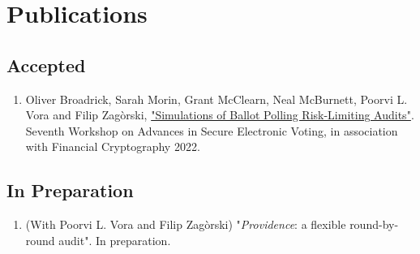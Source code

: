 \documentclass[letterpaper]{article}
\begin{document}
\section*{Publications}

\subsection*{Accepted}
\begin{enumerate}
\item Oliver Broadrick, Sarah Morin, Grant McClearn, Neal McBurnett, Poorvi L. Vora and Filip Zag\`{o}rski, \href{https://oliverbroadrick.com/papers/simulations-of-ballot-polling-rlas.pdf}{"Simulations of Ballot Polling Risk-Limiting Audits"}. Seventh Workshop on Advances in Secure Electronic Voting, in association with Financial Cryptography 2022.
\end{enumerate}
\subsection*{In Preparation}
\begin{enumerate}
\item
(With Poorvi L. Vora and Filip Zag\`{o}rski) "\textit{Providence}: a flexible round-by-round audit". In preparation.
\end{enumerate}

\bigskip
\end{document}
